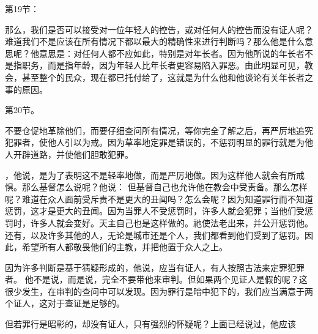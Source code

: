 第19节：\par

那么，我们是否可以接受对一位年轻人的控告，或对任何人的控告而没有证人呢？难道我们不是应该在所有情况下都以最大的精确性来进行判断吗？那么他是什么意思呢？他意思是：对任何人都不应如此，特别是对年长者。因为他所说的年长者不是指职务，而是指年龄，因为年轻人比年长者更容易陷入罪恶。由此明显可见，教会，甚至整个的民众，现在都已托付给了，这就是为什么他和他谈论有关年长者之事的原因。\par

第20节。\par

不要仓促地革除他们，而要仔细查问所有情况，等你完全了解之后，再严厉地追究犯罪者，使他人引以为戒。因为草率地定罪是错误的，不惩罚明显的罪行就是为他人开辟道路，并使他们胆敢犯罪。\par

，他说，是为了表明这不是轻率地做，而是严厉地做。因为这样他人就会有所戒惧。那么基督怎么说呢？他说： 但基督自己也允许他在教会中受责备。那么怎样呢？难道在众人面前受斥责不是更大的丑闻吗？怎么会呢？因为知道罪行而不知道惩罚，这才是更大的丑闻。因为当罪人不受惩罚时，许多人就会犯罪；当他们受惩罚时，许多人就会变好。天主自己也是这样做的。祂使法老出来，并公开惩罚他。还有，以及许多其他的人，无论是城市还是个人，我们都看到他们受到了惩罚。因此，希望所有人都敬畏他们的主教，并把他置于众人之上。\par

因为许多判断是基于猜疑形成的，他说，应当有证人，有人按照古法来定罪犯罪者。  他不是说，而是说，完全不要带他来审判。但如果两个见证人是假的呢？这很少发生，在审判的查问中可以发现。因为罪行是暗中犯下的，我们应当满意于两个证人，这对于查证是足够的。\par

但若罪行是昭彰的，却没有证人，只有强烈的怀疑呢？上面已经说过，他应该\par

